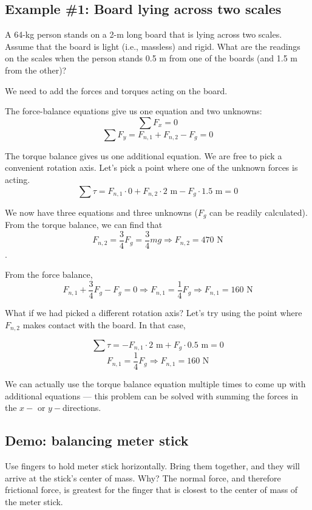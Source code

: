 \subsection{Example \#1: Board lying across two scales}
A 64-kg person stands on a 2-m long board that is lying across two scales. Assume that the board is light (i.e., massless) and rigid. What are the readings on the scales when the person stands 0.5 m from one of the boards (and 1.5 m from the other)?

\vspace{5cm}

We need to add the forces and torques acting on the board.

The force-balance equations give us one equation and two unknowns:
$$\sum F_x = 0$$
$$\sum F_y = F_{n,1}+F_{n,2}-F_g=0$$

The torque balance gives us one additional equation. We are free to pick a convenient rotation axis. Let's pick a point where one of the unknown forces is acting.
$$\sum \tau = F_{n,1}\cdot{0}+F_{n,2}\cdot{2\mbox{ m}}-F_g\cdot{1.5\mbox{ m}}=0$$

We now have three equations and three unknowns ($F_g$ can be readily calculated). From the torque balance, we can find that
$$F_{n,2}=\frac{3}{4}F_g=\frac{3}{4}mg\Rightarrow \boxed{F_{n,2}=470\mbox{ N}}$$.

From the force balance,
$$F_{n,1}+\frac{3}{4}F_g-F_g=0\Rightarrow F_{n,1}=\frac{1}{4}F_g\Rightarrow \boxed{F_{n,1}=160\mbox{ N}}$$


What if we had picked a different rotation axis? Let's try using the point where $F_{n,2}$ makes contact with the board. In that case,

$$\sum\tau = -F_{n,1}\cdot{2\mbox{ m}}+F_g\cdot{0.5\mbox{ m}} = 0$$
$$F_{n,1}=\frac{1}{4}F_g \Rightarrow \boxed{F_{n,1}= 160\mbox{ N}}$$

We can actually use the torque balance equation multiple times to come up with additional equations --- this problem can be solved with summing the forces in the $x-$ or $y-$directions.

\subsection{Demo: balancing meter stick}
Use fingers to hold meter stick horizontally. Bring them together, and they will arrive at the stick's center of mass. Why? The normal force, and therefore frictional force, is greatest for the finger that is closest to the center of mass of the meter stick.

